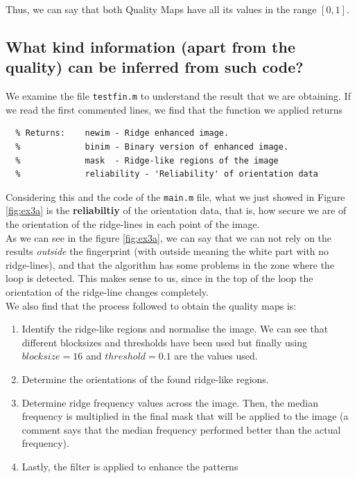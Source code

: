 \documentclass[a4paper]{article}
\def\inline{\lstinline[basicstyle=\ttfamily,keywordstyle={}]}
\begin{document}
Thus, we can say that both Quality Maps have all its values in the range \([0,1]\).

\subsection{ What kind information (apart from the quality) can be inferred from such code?}

We examine the file \inline{testfin.m} to understand the result that we are obtaining. If we read the first commented lines, we find that the function we applied returns
\begin{verbatim}
  % Returns:    newim - Ridge enhanced image.
  %             binim - Binary version of enhanced image.
  %             mask  - Ridge-like regions of the image
  %             reliability - 'Reliability' of orientation data  
\end{verbatim}
Considering this and the code of the \inline{main.m} file, what we just showed in Figure \ref{fig:ex3a} is the \textbf{reliabiltiy} of the orientation data, that is, how secure we are of the orientation of the ridge-lines in each point of the image.\\

As we can see in the figure \ref{fig:ex3a}, we can say that we can not rely on the results \emph{outside} the fingerprint (with outside meaning the white part with no ridge-lines), and that the algorithm has some problems in the zone where the loop is detected. This makes sense to us, since in the top of the loop the orientation of the ridge-line changes completely.\\  

We also find that the process followed to obtain the quality maps is:
\begin{enumerate}
\item Identify the ridge-like regions and normalise the image. We can see that different blocksizes and thresholds have been used but finally using \(blocksize=16\) and \(threshold = 0.1\) are the values used.
\item Determine the orientations of the found ridge-like regions.
\item Determine ridge frequency values across the image. Then, the median frequency is multiplied in the final mask that will be applied to the image (a comment says that the median frequency performed better than the actual frequency).
\item Lastly, the filter is applied to enhance the patterns
\end{enumerate}
\end{document}
